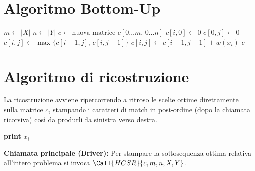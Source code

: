 \section{Algoritmo Bottom-Up}
\begin{algorithm}[htbp]
\caption{Calcolo Bottom-Up dei coefficienti per HCS}
\begin{algorithmic}[1]
    \State $m \gets |X|$
    \State $n \gets |Y|$
    \State $c \gets \text{nuova matrice } c[0 \dots m, \, 0 \dots n]$
        \State $c[i, 0] \gets 0$
    \EndFor
        \State $c[0, j] \gets 0$
    \EndFor
                \State $c[i, j] \gets \max \{ c[i-1, j], \, c[i, j-1] \}$
            \Else
                \State $c[i, j] \gets c[i-1, j-1] + w(x_i)$
            \EndIf
        \EndFor
    \EndFor
    \State \Return $c$
\EndProcedure
\end{algorithmic}
\end{algorithm}

\section{Algoritmo di ricostruzione}
La ricostruzione avviene ripercorrendo a ritroso le scelte ottime direttamente sulla matrice $c$, stampando i caratteri di match in post-ordine (dopo la chiamata ricorsiva) così da produrli da sinistra verso destra.

\begin{algorithm}[htbp]
\caption{Ricostruzione della sequenza HCS}
\begin{algorithmic}[1]
        \State \Return
    \Else
                \State {}
            \Else
                \State {}
            \EndIf
        \Else
            \State {}
            \State \textbf{print} $x_i$
        \EndIf
    \EndIf
\EndProcedure
\end{algorithmic}
\end{algorithm}

\noindent
\textbf{Chiamata principale (Driver):} Per stampare la sottosequenza ottima relativa all'intero problema si invoca $\Call{HCSR}{c, m, n, X, Y}$.

